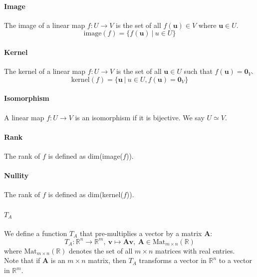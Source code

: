 \documentclass{scrartcl}
\newcommand{\R}{\mathbb{R}}
\renewcommand{\vec}[1]{\mathbf{#1}}
\begin{document}
\paragraph{Image}
The image of a linear map $ f : U \to V $ is the set of all $ f(\vec{u}) \in V $ where $ \vec{u} \in U $.
\begin{equation}
\textrm{image}(f) = \{f(\vec{u}) \ | \ u \in U \}
\end{equation}

\paragraph{Kernel}
The kernel of a linear map $ f : U \to V $ is the set of all $ \vec{u} \in U $ such that $ f(\vec{u}) = \vec{0}_{V} $.
\begin{equation}
\textrm{kernel}(f) = \{\vec{u} \ | \ u \in U, f(\vec{u}) = \vec{0}_{V} \}
\end{equation}

\paragraph{Isomorphism}
A linear map $ f : U \to V $ is an isomorphism if it is bijective. We say $ U \simeq V $.

\paragraph{Rank}
The rank of $ f $ is defined as dim(image($ f $)).

\paragraph{Nullity}
The rank of $ f $ is defined as dim(kernel($ f $)).

\paragraph{$ T_{A} $}
We define a function $ T_{A} $ that pre-multiplies a vector by a matrix $ \vec{A} $:
\begin{equation}
T_{A} : \R^{n} \to \R^{m}, \ \vec{v} \mapsto \vec{A}\vec{v}, \ \vec{A} \in \textrm{Mat}_{m \times n}(\R)
\end{equation}
where $  \textrm{Mat}_{m \times n}(\R)  $ denotes the set of all $ m \times n $ matrices with real entries.
\\
Note that if $ \vec{A} $ is an $ m \times n $ matrix, then $ T_{A} $ transforms a vector in $ \R^{n} $ to a vector in $ \R^{m} $.
\end{document}
